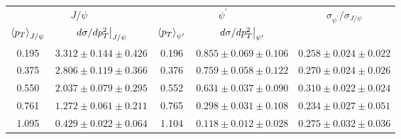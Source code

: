 \begin{tabular}{cc|cc|c}
\hline
\multicolumn{2}{c|}{$J/\psi$} &
  \multicolumn{2}{c|}{$\psi^{\prime}$} &
  \multirow{2}{*}{$\sigma_{\psi^\prime}/\sigma_{J/\psi}$} \\ \cline{1-4}
$\expval{p_T}_{J/\psi}$ &
  $\eval{d\sigma/dp^2_T}_{J/\psi}$ &
  $\expval{p_T}_{\psi^\prime}$ &
  $\eval{d\sigma/dp^2_T}_{\psi^\prime}$ &
   \\ \hline
\multicolumn{1}{c|}{0.195} &
  $3.312\pm0.144\pm0.426$ &
  \multicolumn{1}{c|}{0.196} &
  $0.855\pm0.069\pm0.106$ &
  $0.258\pm0.024\pm0.022$ \\
\multicolumn{1}{c|}{0.375} &
  $2.806\pm0.119\pm0.366$ &
  \multicolumn{1}{c|}{0.376} &
  $0.759\pm0.058\pm0.122$ &
  $0.270\pm0.024\pm0.026$ \\
\multicolumn{1}{c|}{0.550} &
  $2.037\pm0.079\pm0.295$ &
  \multicolumn{1}{c|}{0.552} &
  $0.631\pm0.037\pm0.090$ &
  $0.310\pm0.022\pm0.024$ \\
\multicolumn{1}{c|}{0.761} &
  $1.272\pm0.061\pm0.211$ &
  \multicolumn{1}{c|}{0.765} &
  $0.298\pm0.031\pm0.108$ &
  $0.234\pm0.027\pm0.051$ \\
\multicolumn{1}{c|}{1.095} &
  $0.429\pm0.022\pm0.064$ &
  \multicolumn{1}{c|}{1.104} &
  $0.118\pm0.012\pm0.028$ &
  $0.275\pm0.032\pm0.036$ \\ \hline
\end{tabular}
